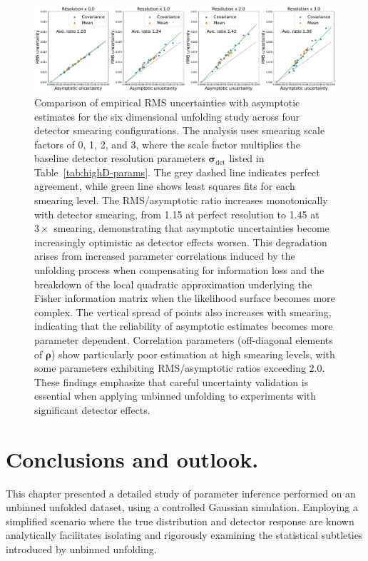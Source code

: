 \begin{figure}
    \centering
    \includegraphics[width=0.8\linewidth]{figures/chapter-07/nn-uncertainties-6d-res-var.pdf}
    \caption[Impact of detector resolution on asymptotic uncertainty reliability in 6-dimensional unfolding.]{Comparison of empirical RMS uncertainties with asymptotic estimates for the six dimensional unfolding study across four detector smearing configurations. The analysis uses smearing scale factors of 0, 1, 2, and 3, where the scale factor multiplies the baseline detector resolution parameters $\boldsymbol{\sigma}_{\text{det}}$ listed in Table~\ref{tab:highD-params}.
    The grey dashed line indicates perfect agreement, while green line shows least squares fits for each smearing level.
    The RMS/asymptotic ratio increases monotonically with detector smearing, from 1.15 at perfect resolution to 1.45 at \(3\times\) smearing, demonstrating that asymptotic uncertainties become increasingly optimistic as detector effects worsen. This degradation arises from increased parameter correlations induced by the unfolding process when compensating for information loss and the breakdown of the local quadratic approximation underlying the Fisher information matrix when the likelihood surface becomes more complex.
    The vertical spread of points also increases with smearing, indicating that the reliability of asymptotic estimates becomes more parameter dependent. Correlation parameters (off-diagonal elements of $\boldsymbol{\rho}$) show particularly poor estimation at high smearing levels, with some parameters exhibiting RMS/asymptotic ratios exceeding 2.0. These findings emphasize that careful uncertainty validation is essential when applying unbinned unfolding to experiments with significant detector effects.\footnotemark
    }
    \label{fig:rms-asy-6D-res}
    \end{figure}

\section{Conclusions and outlook.}
    This chapter presented a detailed study of parameter inference performed on an unbinned unfolded dataset, using a controlled Gaussian simulation.
    Employing a simplified scenario where the true distribution and detector response are known analytically facilitates isolating and rigorously examining the statistical subtleties introduced by unbinned unfolding.
    
